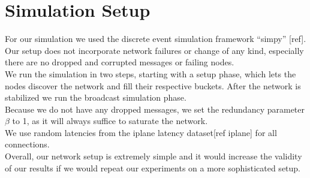 \section{Simulation Setup\label{simulation_setup}}
For our simulation we used the discrete event simulation framework
``simpy'' [ref]. \\
Our setup does not incorporate network failures or change of any kind,
especially there are no dropped and corrupted messages or failing nodes. \\
We run the simulation in two steps, starting with a setup phase, which
lets the nodes discover the network and fill their respective buckets.
After the network is stabilized we run the broadcast simulation phase. \\
Because we do not have any dropped messages, we set the redundancy
parameter $\beta$ 
to 1, as it will always suffice to saturate the network. \\
We use random latencies from the iplane latency dataset[ref iplane] for
all connections. \\
Overall, our network setup is extremely simple and it would increase the
validity of our results if we would repeat our experiments on a more
sophisticated setup.

